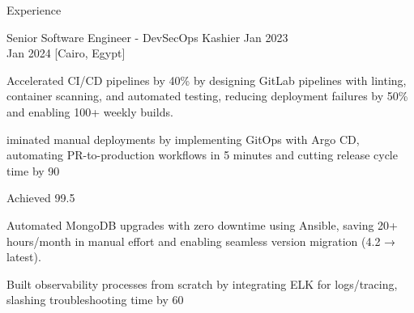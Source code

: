 \begin{rSection}{Experience}
    \begin{rSubsection}
        {Senior Software Engineer - DevSecOps}
        {Kashier}
        {Jan 2023 \\ Jan 2024}
        [Cairo, Egypt]
        \begin{rItemize}
            \item Accelerated CI/CD pipelines by 40\% by designing GitLab pipelines with linting, container scanning, and automated testing, reducing deployment failures by 50\% and enabling 100+ weekly builds.
            \item iminated manual deployments by implementing GitOps with Argo CD, automating PR-to-production workflows in 5 minutes and cutting release cycle time by 90%
            \item Achieved 99.5%
            \item Automated MongoDB upgrades with zero downtime using Ansible, saving 20+ hours/month in manual effort and enabling seamless version migration (4.2 → latest).
            \item Built observability processes from scratch by integrating ELK for logs/tracing, slashing troubleshooting time by 60%
        \end{rItemize}
    \end{rSubsection}


\end{rSection}
